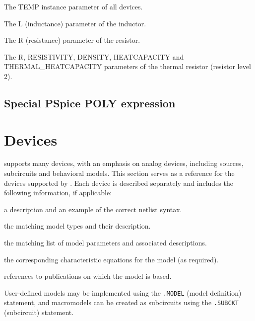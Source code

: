 \begin{XyceItemize}
\item The \textrm{TEMP} instance parameter of all devices.
\item The \textrm{L} (inductance) parameter of the inductor.
\item The \textrm{R} (resistance) parameter of the resistor.
\item The \textrm{R}, \textrm{RESISTIVITY}, \textrm{DENSITY}, \textrm{HEATCAPACITY} and \textrm{THERMAL\_HEATCAPACITY} parameters of the thermal resistor (resistor level 2).
\end{XyceItemize}

\subsection{Special PSpice POLY expression}
\label{PspicePoly}




\newpage
\section{Devices}
\label{Analog_Devices}

\Xyce{} supports many devices, with an emphasis on analog devices, including
sources, subcircuits and behavioral models.  This section serves as a reference
for the devices supported by \Xyce{}.  Each device is described separately and
includes the following information, if applicable:
\begin{XyceItemize}
\item a description and an example of the correct netlist syntax.
\item the matching model types and their description.
\item the matching list of model parameters and associated descriptions.
\item the corresponding
 characteristic equations for the model (as required).
\item references to publications on which the model is based.
\end{XyceItemize}
User-defined models may be implemented using the  \texttt{.MODEL} (model definition)
statement, and macromodels can be created as subcircuits using the
 \texttt{.SUBCKT}
(subcircuit) statement.

